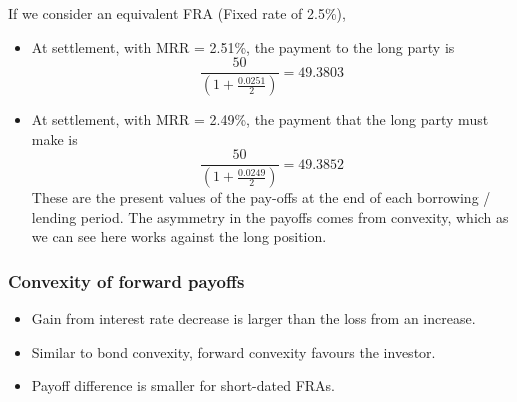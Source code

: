 \documentclass[../notes_compiled.tex]{subfiles}
\begin{document}
\begin{itemize}
{\item[] If we consider an equivalent FRA (Fixed rate of 2.5\%), 
\begin{itemize}
\item At settlement, with MRR = 2.51\%, the payment to the long party is 
\begin{equation*}
\frac{50}{\left( 1 + \frac{0.0251}{2}\right)} = 49.3803
\end{equation*}
\item At settlement, with MRR = 2.49\%, the payment that the long party must make is 
\begin{equation*}
\frac{50}{\left(1 + \frac{0.0249}{2} \right)} = 49.3852
\end{equation*}
These are the present values of the pay-offs at the end of each borrowing / lending period. The asymmetry in the payoffs comes from convexity, which as we can see here works against the long position.
\end{itemize}
}
\end{itemize}
\subsubsection{Convexity of forward payoffs}
\begin{itemize}
\item Gain from interest rate decrease is larger than the loss from an increase.
\item Similar to bond convexity, forward convexity favours the investor.
\item Payoff difference is smaller for short-dated FRAs.
\end{itemize}
\end{document}
